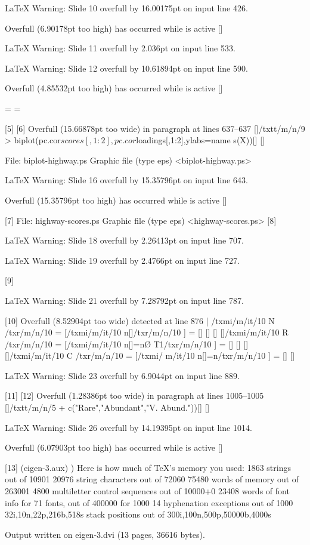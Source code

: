 LaTeX Warning: Slide 10 overfull by 16.00175pt on input line 426.


Overfull \vbox (6.90178pt too high) has occurred while \output is active []



LaTeX Warning: Slide 11 overfull by 2.036pt on input line 533.


LaTeX Warning: Slide 12 overfull by 10.61894pt on input line 590.


Overfull \vbox (4.85532pt too high) has occurred while \output is active []

=
=

[5] [6]
Overfull \hbox (15.66878pt too wide) in paragraph at lines 637--637
[]/txtt/m/n/9 > biplot(pc.cor$scores[,1:2],pc.cor$loadings[,1:2],ylabs=name
s(X))[]
 []

File: biplot-highway.ps Graphic file (type eps)
<biplot-highway.ps>

LaTeX Warning: Slide 16 overfull by 15.35796pt on input line 643.


Overfull \vbox (15.35796pt too high) has occurred while \output is active []


[7]
File: highway-scores.ps Graphic file (type eps)
 <highway-scores.ps> [8]

LaTeX Warning: Slide 18 overfull by 2.26413pt on input line 707.


LaTeX Warning: Slide 19 overfull by 2.4766pt on input line 727.

[9]

LaTeX Warning: Slide 21 overfull by 7.28792pt on input line 787.

[10]
Overfull \hbox (8.52904pt too wide) detected at line 876
| \OML/txmi/m/it/10 N /txr/m/n/10 = [\OML/txmi/m/it/10 n[]/txr/m/n/10 ]
 = []  [] [] []\OML/txmi/m/it/10 R /txr/m/n/10 = [\OML/txmi/m/it/10 n[]=n\O
T1/txr/m/n/10 ] = []  [] [] []\OML/txmi/m/it/10 C /txr/m/n/10 = [\OML/txmi/
m/it/10 n[]=n/txr/m/n/10 ] = []
 []


LaTeX Warning: Slide 23 overfull by 6.9044pt on input line 889.

[11] [12]
Overfull \hbox (1.28386pt too wide) in paragraph at lines 1005--1005
[]/txtt/m/n/5 +                     c("Rare","Abundant","V. Abund."))[]
 []


LaTeX Warning: Slide 26 overfull by 14.19395pt on input line 1014.


Overfull \vbox (6.07903pt too high) has occurred while \output is active []


[13] (eigen-3.aux) )
Here is how much of TeX's memory you used:
 1863 strings out of 10901
 20976 string characters out of 72060
 75480 words of memory out of 263001
 4800 multiletter control sequences out of 10000+0
 23408 words of font info for 71 fonts, out of 400000 for 1000
 14 hyphenation exceptions out of 1000
 32i,10n,22p,216b,518s stack positions out of 300i,100n,500p,50000b,4000s

Output written on eigen-3.dvi (13 pages, 36616 bytes).